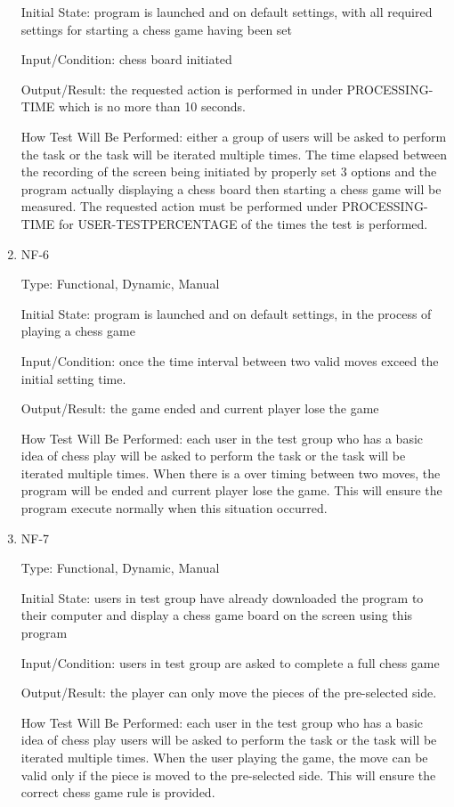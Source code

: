 \documentclass[12pt, titlepage]{article}
\begin{document}
\begin{enumerate}
Initial State: program is launched and on default settings, with all required settings for starting a chess game having been set

Input/Condition: chess board initiated

Output/Result: the requested action is performed in under PROCESSING-TIME which is no more than 10 seconds.

How Test Will Be Performed: either a group of users will be asked to perform the task or the task will be iterated multiple times. The time elapsed between the recording of the screen being initiated by properly set 3 options and the program actually displaying a chess board then starting a chess game will be measured. The requested action must be performed under PROCESSING-TIME for USER-TESTPERCENTAGE of the times the test is performed.

\item{NF-6\\}

Type: Functional, Dynamic, Manual

Initial State: program is launched and on default settings, in the process of playing a chess game

Input/Condition: once the time interval between two valid moves exceed the initial setting time.

Output/Result: the game ended and current player lose the game

How Test Will Be Performed: each user in the test group who has a basic idea of chess play will be asked to perform the task or the task will be iterated multiple times. When there is a over timing between two moves, the program will be ended and current player lose the game. This will ensure the program execute normally when this situation occurred.

\item{NF-7\\}

Type:  Functional, Dynamic, Manual

Initial State: users in test group have already downloaded the program to their computer and display a chess game board on the screen using this program 

Input/Condition: users in test group are asked to complete a full chess game

Output/Result: the player can only move the pieces of the pre-selected side.

How Test Will Be Performed: each user in the test group who has a basic idea of chess play users will be asked to perform the task or the task will be iterated multiple times. When the user playing the game, the move can be valid only if the piece is moved to the pre-selected side. This will ensure the correct chess game rule is provided. 


\end{enumerate}
\end{document}
